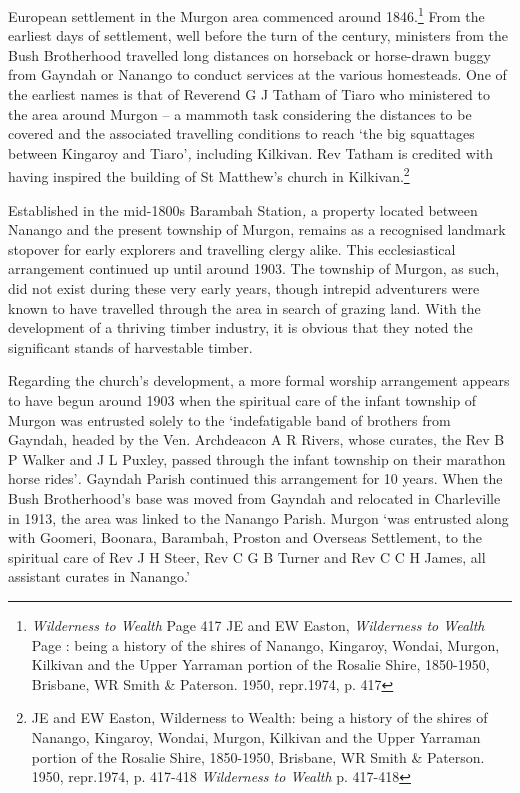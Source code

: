European settlement in the Murgon area commenced around 1846.\footnote{\emph{Wilderness
  to Wealth} Page 417 JE and EW Easton, \emph{Wilderness to Wealth} Page
  : being a history of the shires of Nanango, Kingaroy, Wondai, Murgon,
  Kilkivan and the Upper Yarraman portion of the Rosalie Shire,
  1850-1950, Brisbane, WR Smith \& Paterson. 1950, repr.1974, p. 417}
From the earliest days of settlement, well before the turn of the
century, ministers from the Bush Brotherhood travelled long distances on
horseback or horse-drawn buggy from Gayndah or Nanango to conduct
services at the various homesteads. One of the earliest names is that of
Reverend G J Tatham of Tiaro who ministered to the area around Murgon --
a mammoth task considering the distances to be covered and the
associated travelling conditions to reach `the big squattages between
Kingaroy and Tiaro'\emph{,} including Kilkivan. Rev Tatham is credited
with having inspired the building of St Matthew's church in
Kilkivan.\footnote{JE and EW Easton, Wilderness to Wealth: being a
  history of the shires of Nanango, Kingaroy, Wondai, Murgon, Kilkivan
  and the Upper Yarraman portion of the Rosalie Shire, 1850-1950,
  Brisbane, WR Smith \& Paterson. 1950, repr.1974, p. 417-418
  \emph{Wilderness to Wealth} p. 417-418}

Established in the mid-1800s Barambah Station\emph{,} a property located
between Nanango and the present township of Murgon, remains as a
recognised landmark stopover for early explorers and travelling clergy
alike. This ecclesiastical arrangement continued up until around 1903.
The township of Murgon, as such, did not exist during these very early
years, though intrepid adventurers were known to have travelled through
the area in search of grazing land. With the development of a thriving
timber industry, it is obvious that they noted the significant stands of
harvestable timber.

Regarding the church's development, a more formal worship arrangement
appears to have begun around 1903 when the spiritual care of the infant
township of Murgon was entrusted solely to the `indefatigable band of
brothers from Gayndah, headed by the Ven. Archdeacon A R Rivers, whose
curates, the Rev B P Walker and J L Puxley, passed through the infant
township on their marathon horse rides'\emph{.} Gayndah Parish continued
this arrangement for 10 years. When the Bush Brotherhood's base was
moved from Gayndah and relocated in Charleville in 1913, the area was
linked to the Nanango Parish. Murgon `was entrusted along with Goomeri,
Boonara, Barambah, Proston and Overseas Settlement, to the spiritual
care of Rev J H Steer, Rev C G B Turner and Rev C C H James, all
assistant curates in Nanango.'

